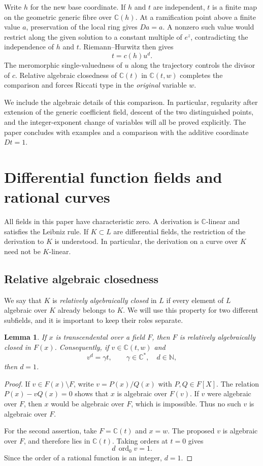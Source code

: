 \documentclass[11pt,reqno]{amsart}
\numberwithin{equation}{section}
\newtheorem{lemma}[theorem]{Lemma}
\theoremstyle{definition}
\theoremstyle{remark}
\newcommand{\C}{\mathbb C}
\newcommand{\N}{\mathbb N}
\newcommand{\ord}{\operatorname{ord}}
\begin{document}
Write $h$ for the new base coordinate. If $h$ and $t$ are independent,
$t$ is a finite map on the geometric generic fibre over $\C(h)$. At a
ramification point above a finite value $a$, preservation of the local
ring gives $Da=a$. A nonzero such value would restrict along the given
solution to a constant multiple of $e^z$, contradicting the independence
of $h$ and $t$. Riemann--Hurwitz then gives
\[
 t=c(h)u^d.
\]
The meromorphic single-valuedness of $u$ along the trajectory controls
the divisor of $c$. Relative algebraic closedness of $\C(t)$ in
$\C(t,w)$ completes the comparison and forces Riccati type in the
\emph{original} variable $w$.

We include the algebraic details of this comparison. In particular,
regularity after extension of the generic coefficient field, descent of
the two distinguished points, and the integer-exponent change of
variables will all be proved explicitly. The paper concludes with
examples and a comparison with the additive coordinate $Dt=1$.

\section{Differential function fields and rational curves}
\label{sec:fields}

All fields in this paper have characteristic zero. A derivation is
$\C$-linear and satisfies the Leibniz rule. If $K\subset L$ are
differential fields, the restriction of the derivation to $K$ is
understood. In particular, the derivation on a curve over $K$ need not
be $K$-linear.

\subsection{Relative algebraic closedness}

We say that $K$ is \emph{relatively algebraically closed} in $L$ if every
element of $L$ algebraic over $K$ already belongs to $K$. We will use
this property for two different subfields, and it is important to keep
their roles separate.

\begin{lemma}
\label{lem:relative}
If $x$ is transcendental over a field $F$, then $F$ is relatively
algebraically closed in $F(x)$. Consequently, if $v\in\C(t,w)$ and
\[
 v^d=\gamma t,\qquad \gamma\in\C^*,\quad d\in\N,
\]
then $d=1$.
\end{lemma}

\begin{proof}
If $v\in F(x)\setminus F$, write $v=P(x)/Q(x)$ with $P,Q\in F[X]$.
The relation $P(x)-vQ(x)=0$ shows that $x$ is algebraic over $F(v)$.
If $v$ were algebraic over $F$, then $x$ would be algebraic over $F$,
which is impossible. Thus no such $v$ is algebraic over $F$.

For the second assertion, take $F=\C(t)$ and $x=w$. The proposed $v$
is algebraic over $F$, and therefore lies in $\C(t)$. Taking orders at
$t=0$ gives
\[
 d\,\ord_0 v=1.
\]
Since the order of a rational function is an integer, $d=1$.
\end{proof}
\end{document}
